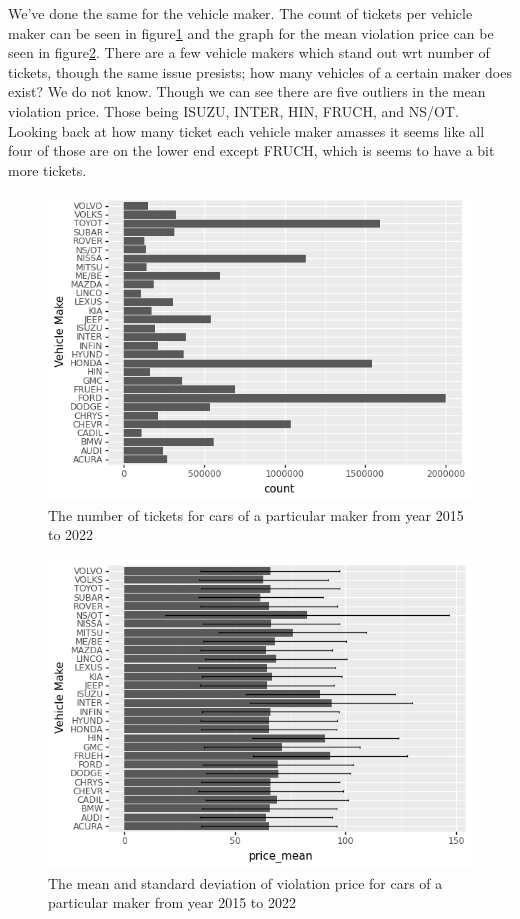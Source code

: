 \documentclass[12pt]{fphw}
\begin{document}
We've done the same for the vehicle maker. The count of tickets per vehicle maker can be seen in figure\ref{fig:maker_1} and the graph for the mean violation price can be seen in figure\ref{fig:maker_2}.
There are a few vehicle makers which stand out wrt number of tickets, though the same issue presists; how many vehicles of a certain maker does exist? We do not know. Though we can see there are five outliers in the mean violation price. Those being ISUZU, INTER, HIN, FRUCH, and NS/OT. Looking back at how many ticket each vehicle maker amasses it seems like all four of those are on the lower end except FRUCH, which is seems to have a bit more tickets.

\begin{figure}[h!]
  \label{fig:maker_1}
  \includegraphics[width=1\textwidth]{figures2/VehicleMaker_count.png}
  \caption{The number of tickets for cars of a particular maker from year 2015 to 2022}
\end{figure}

\begin{figure}[h!]
  \label{fig:maker_2}
  \includegraphics[width=1\textwidth]{figures2/VehicleMaker_price.png}
  \caption{The mean and standard deviation of violation price for cars of a particular maker from year 2015 to 2022}
\end{figure}
\end{document}

